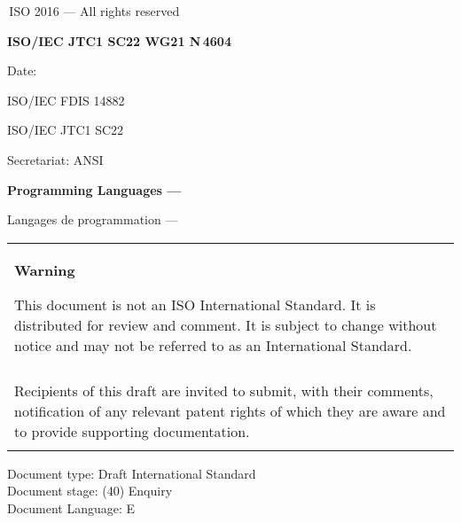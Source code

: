

\thispagestyle{empty}
{\raisebox{.35ex}{\smaller\copyright}}\,ISO 2016 --- All rights reserved
\vspace{2ex}

\begin{flushright}
\textbf{ISO/IEC JTC1 SC22 WG21 N\,\LARGE4604}

Date: \reldate

ISO/IEC FDIS 14882

ISO/IEC JTC1 SC22

Secretariat: ANSI

\end{flushright}

\vfill

\textbf{\LARGE Programming Languages --- \Cpp}

Langages de programmation --- \Cpp

\vfill

\begin{tabular}{|p{\hsize}|}
\hline
\begin{center}
\textbf{Warning}
\end{center}

\vspace{2ex}

This document is not an ISO International Standard. It is distributed
for review and comment. It is subject to change without notice and may
not be referred to as an International Standard.\\\\

Recipients of this draft are invited to submit, with their comments,
notification of any relevant patent rights of which they are aware
and to provide supporting documentation.\\\\
\hline
\end{tabular}

\vfill
\noindent
Document type: Draft International Standard\\
Document stage: (40) Enquiry\\
Document Language: E
\pagebreak

\thispagestyle{cpppage}

